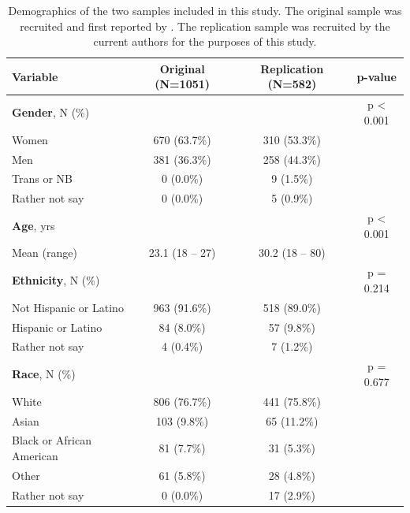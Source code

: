 \documentclass[letterpaper,man,natbib,floatsintext,longtable]{apa6}
\begin{document}
\begin{table}[t!]
    \centering
    \begin{tabular*}{\textwidth}{lccc}
    \toprule
    Variable & Original (N=1051) & Replication (N=582) & p-value \\
    \midrule
    \textbf{Gender}, N (\%)                & & & p < 0.001 \\
    \hspace{1em} Women                     & 670 (63.7\%) & 310 (53.3\%) & \\
    \hspace{1em} Men                       & 381 (36.3\%) & 258 (44.3\%) & \\
    \hspace{1em} Trans or NB               &   0  (0.0\%) &   9  (1.5\%) & \\
    \hspace{1em} Rather not say            &   0  (0.0\%) &   5  (0.9\%) & \\
    \midrule
    \textbf{Age}, yrs                      & & & p < 0.001 \\
    \hspace{1em} Mean (range)              & 23.1 (18 -- 27) & 30.2 (18 -- 80) & \\
    \midrule
    \textbf{Ethnicity}, N (\%)             & & & p = 0.214 \\
    \hspace{1em} Not Hispanic or Latino    & 963 (91.6\%) & 518 (89.0\%) & \\
    \hspace{1em} Hispanic or Latino        &  84  (8.0\%) &  57  (9.8\%) & \\
    \hspace{1em} Rather not say            &   4  (0.4\%) &   7  (1.2\%) & \\
    \midrule
    \textbf{Race}, N (\%)                  & & & p = 0.677 \\
    \hspace{1em} White                     & 806 (76.7\%) & 441 (75.8\%) & \\ 
    \hspace{1em} Asian                     & 103  (9.8\%) &  65 (11.2\%) & \\
    \hspace{1em} Black or African American &  81  (7.7\%) &  31  (5.3\%) & \\
    \hspace{1em} Other                     &  61  (5.8\%) &  28  (4.8\%) & \\
    \hspace{1em} Rather not say            &   0  (0.0\%) &  17  (2.9\%) & \\
    \bottomrule
    \end{tabular*}
    \caption{\normalfont Demographics of the two samples included in this study. The original sample was recruited and first reported by \cite{teicher2015maltreatment}. The replication sample was recruited by the current authors for the purposes of this study.}
    \label{tab:demographics}
\end{table}
\end{document}
